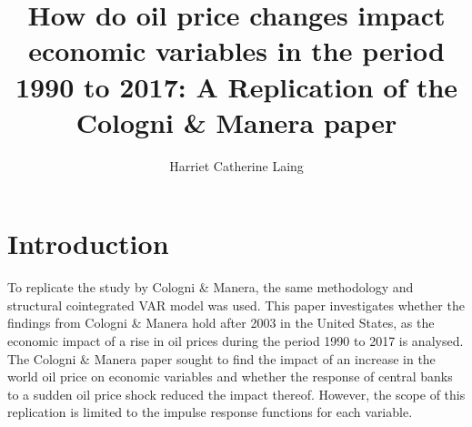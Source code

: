 \documentclass[11pt,preprint, authoryear]{elsarticle}
\numberwithin{equation}{section}
\numberwithin{figure}{section}
\numberwithin{table}{section}
\begin{document}
\begin{frontmatter}  %

\title{How do oil price changes impact economic variables in the period
1990 to 2017: A Replication of the Cologni \& Manera paper}





\author[Add1]{Harriet Catherine Laing}





\address[Add1]{Stellenbosch University, Stellenbosch, South Africa}



\vspace{1cm}





\vspace{0.5cm}

\end{frontmatter}



\pagestyle{fancy}
\chead{}
\rhead{}
\lfoot{}
\lhead{}
\cfoot{}


\headsep 35pt %




\hypertarget{introduction}{%
\section{\texorpdfstring{Introduction
\label{Introduction}}{Introduction }}\label{introduction}}

To replicate the study by Cologni \& Manera, the same methodology and
structural cointegrated VAR model was used. This paper investigates
whether the findings from Cologni \& Manera hold after 2003 in the
United States, as the economic impact of a rise in oil prices during the
period 1990 to 2017 is analysed. The Cologni \& Manera paper sought to
find the impact of an increase in the world oil price on economic
variables and whether the response of central banks to a sudden oil
price shock reduced the impact thereof. However, the scope of this
replication is limited to the impulse response functions for each
variable.
\end{document}
